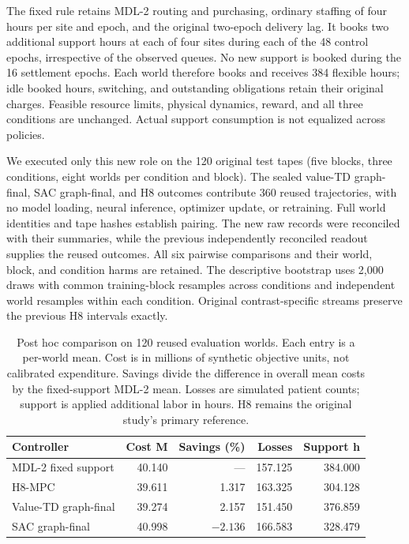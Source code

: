 \documentclass[preprint,review,12pt]{elsarticle}
\begin{document}
The fixed rule retains MDL-2 routing and purchasing, ordinary staffing of
four hours per site and epoch, and the original two-epoch delivery lag.
It books two additional support hours at each of four sites during each of
the 48 control epochs, irrespective of the observed queues. No new support
is booked during the 16 settlement epochs. Each world therefore books and
receives 384 flexible hours; idle booked hours, switching, and outstanding
obligations retain their original charges. Feasible resource limits,
physical dynamics, reward, and all three conditions are unchanged. Actual
support consumption is not equalized across policies.

We executed only this new role on the 120 original test tapes
(five blocks, three conditions, eight worlds per condition and block).
The sealed value-TD graph-final, SAC graph-final, and H8 outcomes contribute
360 reused trajectories, with no model loading, neural inference, optimizer
update, or retraining. Full world identities and tape hashes establish
pairing. The new raw records were reconciled with their summaries, while
the previous independently reconciled readout supplies the reused outcomes.
All six pairwise comparisons and their world, block, and condition harms
are retained. The descriptive bootstrap uses 2,000 draws with common
training-block resamples across conditions and independent world resamples
within each condition. Original contrast-specific streams preserve the
previous H8 intervals exactly.

\begin{table}[tbp]
\centering
\caption{Post hoc comparison on 120 reused evaluation worlds. Each entry is
a per-world mean. Cost is in millions of synthetic objective units, not
calibrated expenditure. Savings divide the difference in overall mean costs
by the fixed-support MDL-2 mean. Losses are simulated patient counts;
support is applied additional labor in hours. H8 remains the original
study's primary reference.}
\label{tab:mdl2-fixed-overall}
\small
\setlength{\tabcolsep}{4pt}
\begin{tabularx}{\textwidth}{Xrrrr}
\toprule
Controller & Cost M & Savings (\%) & Losses & Support h \\
\midrule
MDL-2 fixed support & 40.140 & --- & 157.125 & 384.000 \\
H8-MPC & 39.611 & 1.317 & 163.325 & 304.128 \\
Value-TD graph-final & 39.274 & 2.157 & 151.450 & 376.859 \\
SAC graph-final & 40.998 & $-2.136$ & 166.583 & 328.479 \\
\bottomrule
\end{tabularx}
\end{table}
\end{document}
